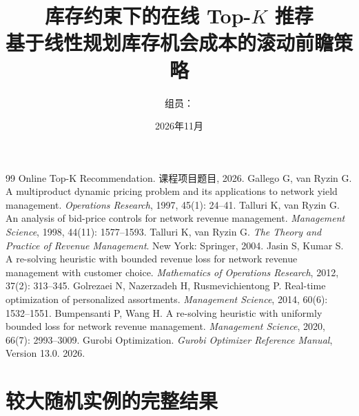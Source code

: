 \documentclass[UTF8,fontset=fandol,a4paper,11pt]{ctexart}
\title{\bfseries 库存约束下的在线 Top-$K$ 推荐\\[0.4em]
\large 基于线性规划库存机会成本的滚动前瞻策略}
\author{组员：\underline{\hspace{9cm}}}
\date{2026年11月}
\theoremstyle{definition}   %
\begin{document}
\maketitle










\begin{thebibliography}{99}
 Online Top-K Recommendation. 课程项目题目, 2026.
 Gallego G, van Ryzin G. A multiproduct dynamic pricing problem and its applications to network yield management. \textit{Operations Research}, 1997, 45(1): 24--41.
 Talluri K, van Ryzin G. An analysis of bid-price controls for network revenue management. \textit{Management Science}, 1998, 44(11): 1577--1593.
 Talluri K, van Ryzin G. \textit{The Theory and Practice of Revenue Management}. New York: Springer, 2004.
 Jasin S, Kumar S. A re-solving heuristic with bounded revenue loss for network revenue management with customer choice. \textit{Mathematics of Operations Research}, 2012, 37(2): 313--345.
 Golrezaei N, Nazerzadeh H, Rusmevichientong P. Real-time optimization of personalized assortments. \textit{Management Science}, 2014, 60(6): 1532--1551.
 Bumpensanti P, Wang H. A re-solving heuristic with uniformly bounded loss for network revenue management. \textit{Management Science}, 2020, 66(7): 2993--3009.
 Gurobi Optimization. \textit{Gurobi Optimizer Reference Manual}, Version 13.0. 2026.
\end{thebibliography}

\appendix

\section{较大随机实例的完整结果}\label{app:large}

\end{document}
